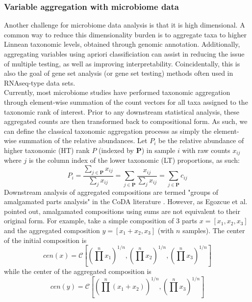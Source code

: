 \documentclass{article}
\begin{document}
 \subsubsection{Variable aggregation with microbiome data} 
 Another challenge for microbiome data analysis is that it is high dimensional. A common way to reduce this dimensionality burden is to aggregate taxa to higher Linnean taxonomic levels, obtained through genomic annotation. Additionally, aggregating variables using apriori classificiation can assist in reducing the issue of multiple testing, as well as improving interpretability. Coincidentally, this is also the goal of gene set analysis (or gene set testing) methods often used in RNAseq-type data sets.  \\
 Currently, most microbiome studies have performed taxonomic aggregation through element-wise summation of the count vectors for all taxa assigned to the taxonomic rank of interest. Prior to any downstream statistical analysis, these aggregated counts are then transformed back to compositional form. As such, we can define the classical taxonomic aggregation processs as simply the element-wise summation of the relative abundances. Let $P_{i}$ be the relative abundance of higher taxonomic (HT) rank $P$ (indexed by $\bm{P}$) in sample $i$ with raw counts $x_{ij}$ where $j$ is the column index of the lower taxonomic (LT) proportions, as such:
\begin{equation}
P_{i} =\frac{\sum_{j \in \bm{P}} x_{ij}}{\sum_j x_{ij}} = \sum_{j \in \bm{P}} \frac{x_{ij}}{\sum_j x_{ij}} = \sum_{j \in \bm{P}} c_{ij}
\end{equation}
\noindent Downstream analysis of aggregated compositions are termed "groups of amalgamated parts analysis" in the CoDA literature \cite{egozcue2005}. However, as Egozcue et al. \cite{egozcue2005} pointed out, amalgamated compositions using sums are not equivalent to their original form. For example, take a simple composition of 3 parts $x = [x_1, x_2, x_3]$ and the aggregated composition $y = [x_1 + x_2, x_3]$ (with $n$ samples). The center \cite{aitchison} of the initial composition is 
\[cen(x) = \mathcal{C}\left[ (\prod^n x_1)^{1/n}, (\prod^n x_2)^{1/n}, (\prod^n x_3)^{1/n} \right]\]
while the center of the aggregated composition is 
\[cen(y) = \mathcal{C}\left[ (\prod^n (x_1 + x_2))^{1/n}, (\prod^n x_3)^{1/n} \right]\]
\end{document}
